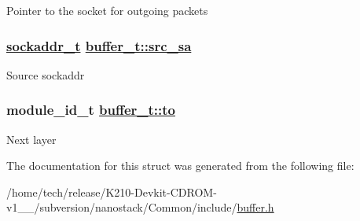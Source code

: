 Pointer to the socket for outgoing packets \hypertarget{structbuffer__t_a93121920765652ba07cf01351cea7c2}{
\subsubsection[src\_\-sa]{\setlength{\rightskip}{0pt plus 5cm}\hyperlink{structsockaddr__t}{sockaddr\_\-t} \hyperlink{structbuffer__t_a93121920765652ba07cf01351cea7c2}{buffer\_\-t::src\_\-sa}}}
\label{structbuffer__t_a93121920765652ba07cf01351cea7c2}


Source sockaddr \hypertarget{structbuffer__t_655f0a9f1662c7386e350d55b0ebe804}{
\subsubsection[to]{\setlength{\rightskip}{0pt plus 5cm}module\_\-id\_\-t \hyperlink{structbuffer__t_655f0a9f1662c7386e350d55b0ebe804}{buffer\_\-t::to}}}
\label{structbuffer__t_655f0a9f1662c7386e350d55b0ebe804}


Next layer 

The documentation for this struct was generated from the following file:\begin{CompactItemize}
\item 
/home/tech/release/K210-Devkit-CDROM-v1\_\_/subversion/nanostack/Common/include/\hyperlink{buffer_8h}{buffer.h}\end{CompactItemize}
